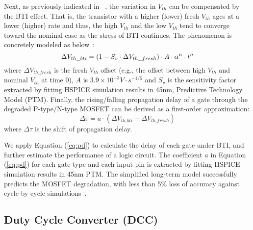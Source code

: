 Next, as previously indicated in~\cite{wang2010impact, gomez2016early} , the variation in $V_{th}$ can be compensated by the BTI effect. That is, the transistor with a higher (lower) fresh $V_{th}$ ages at a lower (higher) rate and thus, the high $V_{th}$ and the low $V_{th}$ tend to converge toward the nominal case as the stress of BTI continues. The phenomenon is concretely modeled as below~\cite{gomez2016early}:
\begin{equation}
	\centering
	\Delta V_{th\_bti} = (1 - S_{v} \cdot \Delta V_{th\_fresh})  \cdot A \cdot \alpha^n \cdot t^n
	\label{eq:cor}
\end{equation}
where $\Delta V_{th\_fresh}$ is the fresh $V_{th}$ offset (e.g., the offset between high $V_{th}$ and nominal $V_{th}$ at time 0), $A$ is $3.9 \times 10^{-3} V \cdot s^{-1/5}$ and $S_{v}$ is the sensitivity factor extracted by fitting HSPICE simulation results in 45nm, Predictive Technology Model (PTM).
Finally, the rising/falling propagation delay of a gate through the degraded P-type/N-type MOSFET can be derived as a first-order approximation:
\begin{equation}
	\label{eq:pd}
	\Delta \tau = a \cdot (\Delta V_{th\_bti} + \Delta V_{th\_fresh})
\end{equation}
where $\Delta \tau$ is the shift of propagation delay.

We apply Equation (\ref{eq:pd}) to calculate the delay of each gate under BTI, and further estimate the performance of a logic circuit. The coefficient $a$ in Equation (\ref{eq:pd}) for each gate type and each input pin is extracted by fitting HSPICE simulation results in 45nm PTM. The simplified long-term model successfully predicts the MOSFET degradation, with less than 5\% loss of accuracy against cycle-by-cycle simulations~\cite{wang2007efficient, wang2010impact, gomez2016early, amrouch2016reliability}.

\subsection{Duty Cycle Converter (DCC)}



